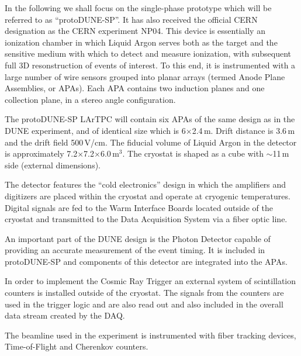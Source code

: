 \documentclass[pdftex,12pt,letter]{article}
\begin{document}
In the following we shall focus on the single-phase prototype which will be referred to as ``protoDUNE-SP''.
It has also received the official CERN designation as the CERN experiment NP04.
This device is essentially an ionization chamber in which Liquid Argon serves both as the target and
the sensitive medium with which to detect and measure ionization, with subsequent full 3D resonstruction of
events of interest. To this end, it is instrumented with a large number
of wire sensors grouped into planar arrays (termed Anode Plane Assemblies, or APAs). Each APA contains
two induction planes and one collection plane, in a stereo angle configuration.

The protoDUNE-SP LArTPC will contain six APAs of the same design as in the DUNE
experiment, and of identical size which is 6$\times$2.4\,m. Drift distance is 3.6\,m
and the drift field 500\,V/cm. The fiducial volume of Liquid Argon in the detector
is approximately 7.2$\times$7.2$\times$6.0\,m$^3$. The cryostat is shaped as a cube
with $\sim$11\,m side (external dimensions).

The detector features the ``cold electronics'' design
in which the amplifiers and digitizers are placed within the cryostat and operate at
cryogenic temperatures. Digital signals are fed to the Warm Interface Boards located
outside of the cryostat and transmitted to the Data Acquisition System via a fiber
optic line.

An important part of the DUNE design is the Photon Detector capable of providing an accurate measurement
of the event timing. It is included in protoDUNE-SP and components of this detector are integrated
into the APAs.

In order to implement the Cosmic Ray Trigger an external system of scintillation counters is installed
outside of the cryostat. The signals from the counters are used in the trigger logic and are also
read out and also included in the overall data stream created by the DAQ.

The beamline used in the experiment is instrumented with fiber tracking devices, Time-of-Flight and Cherenkov counters.
\end{document}
